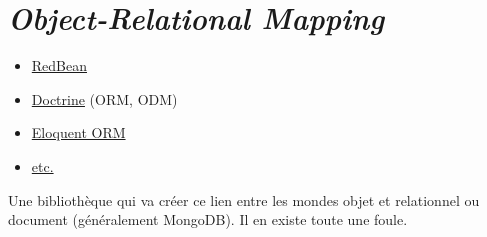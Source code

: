 \hypertarget{object-relational-mapping}{%
\section{\texorpdfstring{\emph{Object-Relational
Mapping}}{Object-Relational Mapping}}\label{object-relational-mapping}}

\begin{itemize}
\tightlist
\item
  \href{http://www.redbeanphp.com/}{RedBean}
\item
  \href{http://www.doctrine-project.org/}{Doctrine} (ORM, ODM)
\item
  \href{http://laravel.com/docs/master/eloquent}{Eloquent ORM}
\item
  \href{https://en.wikipedia.org/wiki/List_of_object-relational_mapping_software\#PHP}{etc.}
\end{itemize}

Une bibliothèque qui va créer ce lien entre les mondes objet et
relationnel ou document (généralement MongoDB). Il en existe toute une
foule.

\begin{english}

\begin{Shaded}
\begin{Highlighting}[]
 
 \OtherTok{;}
\OtherTok{(}\OtherTok{);}
 \OtherTok{(}\NormalTok{ === }\OtherTok{)}\NormalTok{ \{}
    \NormalTok{ = }\OtherTok{(}\OtherTok{,} \OtherTok{);}
     \OtherTok{(}
        \OtherTok{,}
\OtherTok{(}\OtherTok{,} \OtherTok{)}
    \OtherTok{);}
\NormalTok{\} }\NormalTok{ \{}
    \NormalTok{ = }\OtherTok{(}\OtherTok{);}
     \OtherTok{(}
        \OtherTok{,}
\OtherTok{(}\OtherTok{,} \OtherTok{)}
    \OtherTok{);}
\NormalTok{\}}
\end{Highlighting}
\end{Shaded}

\end{english}


